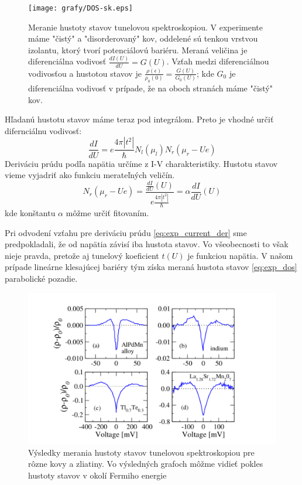 \begin{figure}[H]
\begin{center}
 \texttt{[image: grafy/DOS-sk.eps]}
 \end{center}
 \caption{Meranie hustoty stavov tunelovou spektroskopiou. V experimente máme "čistý" a "disorderovaný" kov, 
 oddelené sú tenkou vrstvou izolantu, ktorý tvorí potenciálovú bariéru. Meraná veličina je diferenciálna
 vodivosť $\frac{dI(U)}{dU}=G(U)$. Vzťah medzi diferenciálnou vodivosťou a hustotou stavov je 
 $\frac{\rho(\epsilon)}{\rho_0(0)}=\frac{G(U)}{G_0(U)}$; kde $G_0$ je diferenciálna vodivosť v prípade, 
 že na oboch stranách máme "čistý" kov.}
 \label{fig:exp_dos_meranie}
\end{figure} 
Hľadanú hustotu stavov máme teraz pod integrálom. Preto je vhodné určiť difernciálnu vodivosť:
\begin{equation}
 \label{eq:exp_current_der}
  \frac{dI}{dU}=e\frac{4\pi|t^2|}{\hbar} N_l(\mu_l) N_r(\mu_r-Ue)
\end{equation} 
Deriváciu prúdu podľa napätia určíme z I-V charakteristiky. Hustotu stavov vieme vyjadriť ako funkciu merateľných veličín.
\begin{equation}
 \label{eq:exp_dos}
 N_r(\mu_r-Ue)= \frac{\frac{dI}{dU}(U)}{e\frac{4\pi|t^2|}{\hbar}}=\alpha \frac{dI}{dU}(U)
\end{equation} 
kde konštantu $\alpha$ môžme určiť fitovaním.

Pri odvodení vzťahu pre deriváciu prúdu \eqref{eq:exp_current_der} sme predpokladali, že od napätia závisí iba hustota stavov.
Vo všeobecnosti to však nieje pravda, pretože aj tunelový koeficient $t(U)$ je funkciou napätia. V našom prípade lineárne klesajúcej bariéry
tým získa meraná hustota stavov \eqref{eq:exp_dos} parabolické pozadie. 
\begin{figure}[H]
\begin{center}
 \includegraphics[scale=0.7]{grafy/B2}
 \end{center}
 \caption{Výsledky merania hustoty stavov tunelovou spektroskopiou pre rôzne kovy a zliatiny. Vo výsledných grafoch 
 môžme vidieť pokles hustoty stavov v okolí Fermiho energie}
 \label{fig:exp_results} 
\end{figure}

